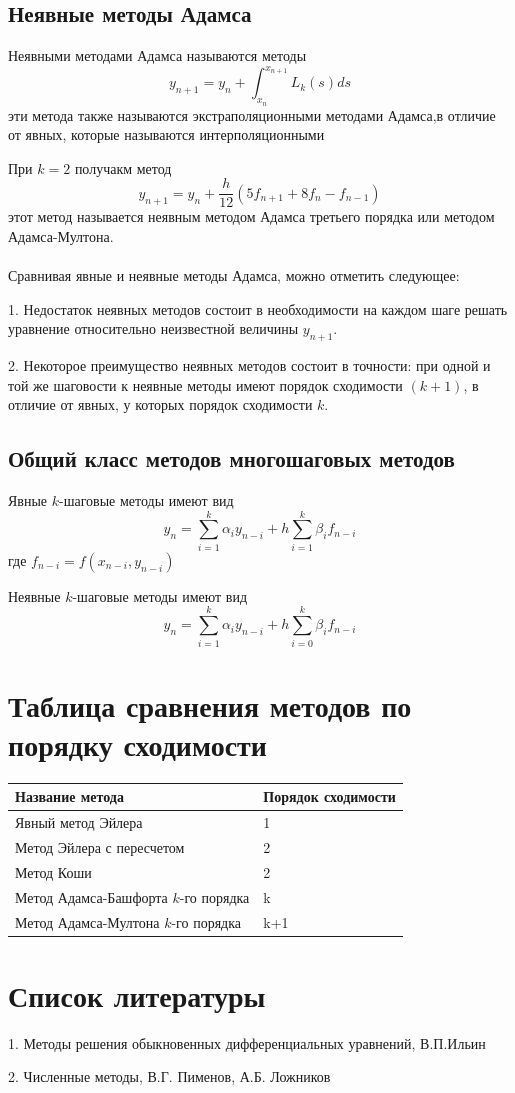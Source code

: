\documentclass[a4paper, 14pt]{extarticle}
\begin{document}
\subsection{Неявные методы Адамса}
Неявными методами Адамса называются методы
\[y_{n+1}=y_n+\int^{x_{n+1}}_{x_n}L_{k}(s)ds\]
эти метода также называются экстраполяционными методами Адамса,в отличие от явных, которые называются 
интерполяционными
\par 
При \(k=2\) получакм метод 
\[y_{n+1}=y_n+\frac{h}{12}(5f_{n+1}+8f_n-f_{n-1})\]
этот метод называется неявным методом Адамса третьего порядка или методом Адамса-Мултона.

\paragraph{}
Сравнивая явные и неявные методы Адамса, можно отметить следующее:
\par
1. Недостаток неявных методов состоит в необходимости на
каждом шаге решать уравнение относительно неизвестной величины \( y_{n+1} \).
\par
2. Некоторое преимущество неявных методов состоит в точности: при одной и той же шаговости к неявные методы имеют
порядок сходимости \((k + 1)\), в отличие от явных, у которых порядок сходимости \(k\).

\subsection{Общий класс методов многошаговых методов}
Явные \(k\)-шаговые методы имеют вид
\[y_n=\sum^k_{i=1}\alpha_iy_{n-i}+h\sum^k_{i=1}\beta_if_{n-i}\]
где \(f_{n-i}=f(x_{n-i},y_{n-i})\) \par
Неявные \(k\)-шаговые методы имеют вид
\[y_n=\sum^k_{i=1}\alpha_iy_{n-i}+h\sum^k_{i=0}\beta_if_{n-i}\]

\section{Таблица сравнения методов по порядку сходимости}

\begin{center}
\begin{tabular}{| l | l |}
    \hline
     Название метода & Порядок сходимости \\ \hline
     Явный метод Эйлера & 1 \\
     Метод Эйлера с пересчетом & 2 \\
     Метод Коши & 2 \\
     Метод Адамса-Башфорта \(k\)-го порядка & k \\
     Метод Адамса-Мултона \(k\)-го порядка & k+1 \\
     \hline
\end{tabular}
\end{center}

\newpage
\section*{Список литературы}

1. Методы решения обыкновенных дифференциальных уравнений, В.П.Ильин 
\par
2. Численные методы, В.Г. Пименов, А.Б. Ложников 
\end{document}
